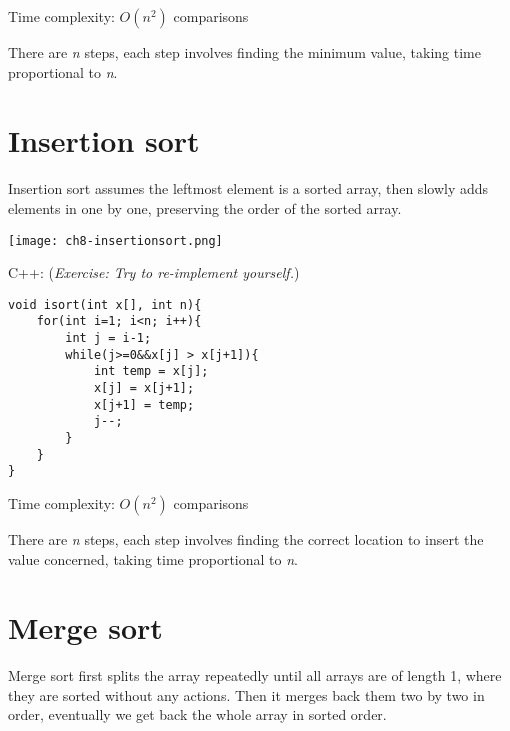 Time complexity: $O(n^2)$ comparisons
\vspace{6mm}

There are \textit{n} steps, each step involves finding the minimum value, taking time proportional to \textit{n}.

\pagebreak

\section{Insertion sort}

Insertion sort assumes the leftmost element is a sorted array, then slowly adds elements in one by one, preserving the order of the sorted array.

\texttt{[image: ch8-insertionsort.png]}



\pagebreak

C++: (\textit{Exercise: Try to re-implement yourself.})
\begin{lstlisting}
void isort(int x[], int n){
    for(int i=1; i<n; i++){
        int j = i-1;
        while(j>=0&&x[j] > x[j+1]){
            int temp = x[j];
            x[j] = x[j+1];
            x[j+1] = temp;
            j--;
        }
    }
}
\end{lstlisting}

Time complexity: $O(n^2)$ comparisons
\vspace{6mm}

There are \textit{n} steps, each step involves finding the correct location to insert the value concerned, taking time proportional to \textit{n}.

\pagebreak

\section{Merge sort}

Merge sort first splits the array repeatedly until all arrays are of length 1, where they are sorted without any actions. Then it merges back them two by two in order, eventually we get back the whole array in sorted order.


